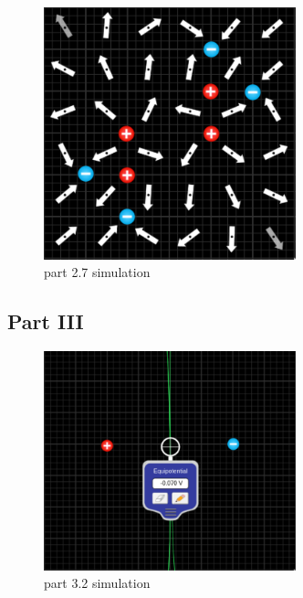 \documentclass{article}
\begin{document}
\begin{figure}[H]
	\begin{center}
		\includegraphics[width=0.65\textwidth]{part-2.7-simulation} %
		\caption{part 2.7 simulation}
	\end{center}
\end{figure}

\subsection{Part III}%
\label{sub:part_3}

\begin{figure}[H]
	\begin{center}
		\includegraphics[width=0.65\textwidth]{part-3.2-simulation} %
		\caption{part 3.2 simulation}
	\end{center}
\end{figure}
\end{document}
